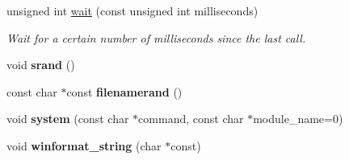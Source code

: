 \begin{DoxyCompactItemize}
\item 
unsigned int \hyperlink{namespacecimg__library_1_1cimg_a3c8917c0f12139bff6de6e3e45fc5b77}{wait} (const unsigned int milliseconds)
\begin{DoxyCompactList}\small\item\em Wait for a certain number of milliseconds since the last call. \end{DoxyCompactList}\item 
\hypertarget{namespacecimg__library_1_1cimg_a84a2f7a220ba6a54893f695b3bcc36e2}{void {\bfseries srand} ()}\label{namespacecimg__library_1_1cimg_a84a2f7a220ba6a54893f695b3bcc36e2}

\item 
\hypertarget{namespacecimg__library_1_1cimg_aa7901dc276d6d1cbf8b2b5403de333e2}{const char $\ast$const {\bfseries filenamerand} ()}\label{namespacecimg__library_1_1cimg_aa7901dc276d6d1cbf8b2b5403de333e2}

\item 
\hypertarget{namespacecimg__library_1_1cimg_a63683d56e98ba23eb5a94a1999168c9f}{void {\bfseries system} (const char $\ast$command, const char $\ast$module\-\_\-name=0)}\label{namespacecimg__library_1_1cimg_a63683d56e98ba23eb5a94a1999168c9f}

\item 
\hypertarget{namespacecimg__library_1_1cimg_a0b06bf61d780b1786de1c33de67d4ede}{void {\bfseries winformat\-\_\-string} (char $\ast$const)}\label{namespacecimg__library_1_1cimg_a0b06bf61d780b1786de1c33de67d4ede}


\end{DoxyCompactItemize}
